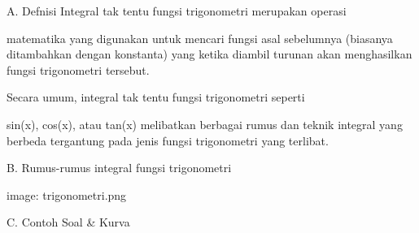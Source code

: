 \documentclass[a4paper,10pt]{article}
\begin{document}
\begin{eulernotebook}
\begin{eulercomment}
\end{eulercomment}
\begin{eulerttcomment}
        A. Defnisi
    Integral tak tentu fungsi trigonometri merupakan operasi
\end{eulerttcomment}
\begin{eulercomment}
matematika yang digunakan untuk mencari fungsi asal sebelumnya
(biasanya ditambahkan dengan konstanta) yang ketika diambil turunan
akan menghasilkan fungsi trigonometri tersebut.\\
\end{eulercomment}
\begin{eulerttcomment}
    Secara umum, integral tak tentu fungsi trigonometri seperti
\end{eulerttcomment}
\begin{eulercomment}
sin(x), cos(x), atau tan(x) melibatkan berbagai rumus dan teknik
integral yang berbeda tergantung pada jenis fungsi trigonometri yang
terlibat.

\end{eulercomment}
\begin{eulerttcomment}
        B. Rumus-rumus integral fungsi trigonometri
\end{eulerttcomment}
\begin{eulercomment}

image: trigonometri.png

\end{eulercomment}
\begin{eulerttcomment}
        C. Contoh Soal & Kurva
\end{eulerttcomment}
\begin{eulercomment}


\end{eulercomment}
\end{eulernotebook}
\end{document}
